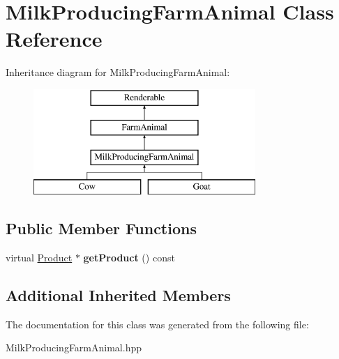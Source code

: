 \hypertarget{class_milk_producing_farm_animal}{}\section{Milk\+Producing\+Farm\+Animal Class Reference}
\label{class_milk_producing_farm_animal}
Inheritance diagram for Milk\+Producing\+Farm\+Animal\+:\begin{figure}[H]
\begin{center}
\leavevmode
\includegraphics[height=4.000000cm]{class_milk_producing_farm_animal}
\end{center}
\end{figure}
\subsection*{Public Member Functions}
\begin{DoxyCompactItemize}
\item 
\mbox{\label{class_milk_producing_farm_animal_ae8f8e6279e5e39ff09d2138d6c9a0b5b}} 
virtual \mbox{\hyperlink{class_product}{Product}} $\ast$ {\bfseries get\+Product} () const
\end{DoxyCompactItemize}
\subsection*{Additional Inherited Members}


The documentation for this class was generated from the following file\+:\begin{DoxyCompactItemize}
\item 
Milk\+Producing\+Farm\+Animal.\+hpp\end{DoxyCompactItemize}
